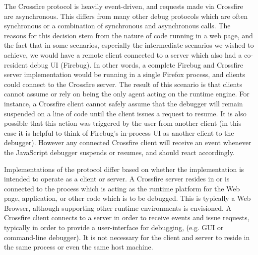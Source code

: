 The Crossfire protocol is heavily event-driven, and requests made via Crossfire
are asynchronous. This differs from many other debug protocols which are often
synchronous or a combination of synchronous and asynchronous calls.  The reasons
for this decision stem from the nature of code running in a web page, and the
fact that in some scenarios, especially the intermediate scenarios we wished to
achieve, we would have a remote client connected to a server which also had a
co-resident debug UI (Firebug). In other words, a complete Firebug and Crossfire
server implementation would be running in a single Firefox process, and clients
could connect to the Crossfire server. The result of this scenario is that
clients cannot assume or rely on being the only agent acting on the runtime
engine. For instance, a Crossfire client cannot safely assume that the debugger
will remain suspended on a line of code until the client issues a request to
resume. It is also possible that this action was triggered by the user from
another client (in this case it is helpful to think of Firebug's in-process UI
as another client to the debugger). However any connected Crossfire client will
receive an event whenever the JavaScript debugger suspends or resumes, and
should react accordingly.

Implementations of the protocol differ based on whether the implementation is
intended to operate as a client or server. A Crossfire server resides in or is
connected to the process which is acting as the runtime platform for the Web
page, application, or other code which is to be debugged. This is typically a
Web Browser, although supporting other runtime environments is envisioned. A
Crossfire client connects to a server in order to receive events and issue
requests, typically in order to provide a user-interface
for debugging, (e.g. GUI or command-line debugger). It is not necessary for the
client and server to reside in the same process or even the same host machine.



